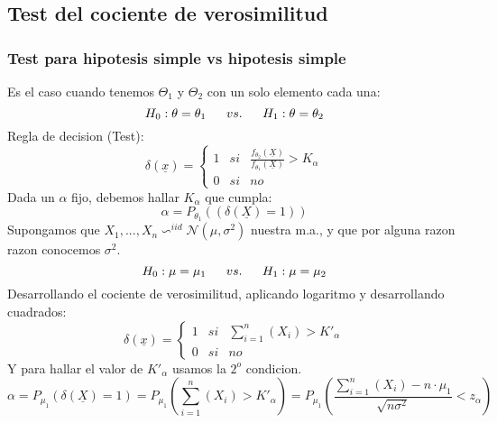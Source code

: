 \documentclass[titlepage,a4paper]{article}
\begin{document}
\subsection{Test del cociente de verosimilitud}
\subsubsection{Test para hipotesis simple vs hipotesis simple}
Es el caso cuando tenemos $\Theta_{1}$ y $\Theta_{2}$ con un solo elemento cada una:
\begin{equation*}
    H_{0}: \theta = \theta_{1} \hspace{16px} vs. \hspace{16px} H_{1}: \theta = \theta_{2}
\end{equation*}
Regla de decision (Test):
\begin{equation*}
    \delta(\underline{x})= \left\{ \begin{array}{lcc}
        1 &   si  & \frac{f_{\theta_{2}}(\underline{X})}{f_{\theta_{1}}(\underline{X})} > K_{\alpha} \\
        0 &  si & no
        \end{array}
    \right.
\end{equation*}
Dada un $\alpha$ fijo, debemos hallar $K_{\alpha}$ que cumpla:
\begin{equation*}
    \alpha = P_{\theta_{1}}((\delta(\underline{X}) = 1))
\end{equation*}
Supongamos que $X_{1},...,X_{n} \backsim^{iid} \mathcal{N}(\mu,\sigma^{2})$ nuestra m.a., y que por alguna razon razon conocemos $\sigma^{2}$.
\begin{equation*}
    H_{0}: \mu = \mu_{1} \hspace{16px} vs. \hspace{16px} H_{1}: \mu = \mu_{2}
\end{equation*}
Desarrollando el cociente de verosimilitud, aplicando logaritmo y desarrollando cuadrados:
\begin{equation*}
    \delta(\underline{x})= \left\{ \begin{array}{lcc}
        1 &   si  & \sum_{i=1}^{n}(X_{i}) > K'_{\alpha} \\
        0 &  si & no
        \end{array}
    \right.
\end{equation*}
Y para hallar el valor de $K'_{\alpha}$ usamos la $2^{o}$ condicion.
\begin{equation*}
    \alpha = P_{\mu_{1}}(\delta(\underline{X}) =1) = P_{\mu_{1}}(\sum_{i=1}^{n}(X_{i}) > K'_{\alpha}) = P_{\mu_{1}}(\frac{\sum_{i=1}^{n}(X_{i})-n \cdot \mu_{1}}{\sqrt{n\sigma^{2}}}< z _{\alpha})
\end{equation*}
\end{document}
